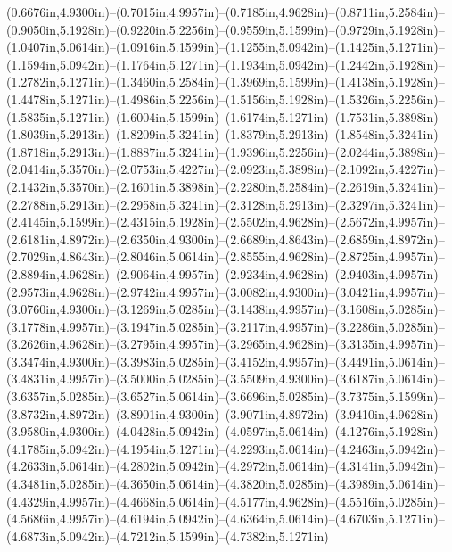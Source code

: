 (0.6676in,4.9300in)--(0.7015in,4.9957in)--(0.7185in,4.9628in)--(0.8711in,5.2584in)--(0.9050in,5.1928in)--(0.9220in,5.2256in)--(0.9559in,5.1599in)--(0.9729in,5.1928in)--(1.0407in,5.0614in)--(1.0916in,5.1599in)--(1.1255in,5.0942in)--(1.1425in,5.1271in)--(1.1594in,5.0942in)--(1.1764in,5.1271in)--(1.1934in,5.0942in)--(1.2442in,5.1928in)--(1.2782in,5.1271in)--(1.3460in,5.2584in)--(1.3969in,5.1599in)--(1.4138in,5.1928in)--(1.4478in,5.1271in)--(1.4986in,5.2256in)--(1.5156in,5.1928in)--(1.5326in,5.2256in)--(1.5835in,5.1271in)--(1.6004in,5.1599in)--(1.6174in,5.1271in)--(1.7531in,5.3898in)--(1.8039in,5.2913in)--(1.8209in,5.3241in)--(1.8379in,5.2913in)--(1.8548in,5.3241in)--(1.8718in,5.2913in)--(1.8887in,5.3241in)--(1.9396in,5.2256in)--(2.0244in,5.3898in)--(2.0414in,5.3570in)--(2.0753in,5.4227in)--(2.0923in,5.3898in)--(2.1092in,5.4227in)--(2.1432in,5.3570in)--(2.1601in,5.3898in)--(2.2280in,5.2584in)--(2.2619in,5.3241in)--(2.2788in,5.2913in)--(2.2958in,5.3241in)--(2.3128in,5.2913in)--(2.3297in,5.3241in)--(2.4145in,5.1599in)--(2.4315in,5.1928in)--(2.5502in,4.9628in)--(2.5672in,4.9957in)--(2.6181in,4.8972in)--(2.6350in,4.9300in)--(2.6689in,4.8643in)--(2.6859in,4.8972in)--(2.7029in,4.8643in)--(2.8046in,5.0614in)--(2.8555in,4.9628in)--(2.8725in,4.9957in)--(2.8894in,4.9628in)--(2.9064in,4.9957in)--(2.9234in,4.9628in)--(2.9403in,4.9957in)--(2.9573in,4.9628in)--(2.9742in,4.9957in)--(3.0082in,4.9300in)--(3.0421in,4.9957in)--(3.0760in,4.9300in)--(3.1269in,5.0285in)--(3.1438in,4.9957in)--(3.1608in,5.0285in)--(3.1778in,4.9957in)--(3.1947in,5.0285in)--(3.2117in,4.9957in)--(3.2286in,5.0285in)--(3.2626in,4.9628in)--(3.2795in,4.9957in)--(3.2965in,4.9628in)--(3.3135in,4.9957in)--(3.3474in,4.9300in)--(3.3983in,5.0285in)--(3.4152in,4.9957in)--(3.4491in,5.0614in)--(3.4831in,4.9957in)--(3.5000in,5.0285in)--(3.5509in,4.9300in)--(3.6187in,5.0614in)--(3.6357in,5.0285in)--(3.6527in,5.0614in)--(3.6696in,5.0285in)--(3.7375in,5.1599in)--(3.8732in,4.8972in)--(3.8901in,4.9300in)--(3.9071in,4.8972in)--(3.9410in,4.9628in)--(3.9580in,4.9300in)--(4.0428in,5.0942in)--(4.0597in,5.0614in)--(4.1276in,5.1928in)--(4.1785in,5.0942in)--(4.1954in,5.1271in)--(4.2293in,5.0614in)--(4.2463in,5.0942in)--(4.2633in,5.0614in)--(4.2802in,5.0942in)--(4.2972in,5.0614in)--(4.3141in,5.0942in)--(4.3481in,5.0285in)--(4.3650in,5.0614in)--(4.3820in,5.0285in)--(4.3989in,5.0614in)--(4.4329in,4.9957in)--(4.4668in,5.0614in)--(4.5177in,4.9628in)--(4.5516in,5.0285in)--(4.5686in,4.9957in)--(4.6194in,5.0942in)--(4.6364in,5.0614in)--(4.6703in,5.1271in)--(4.6873in,5.0942in)--(4.7212in,5.1599in)--(4.7382in,5.1271in) 